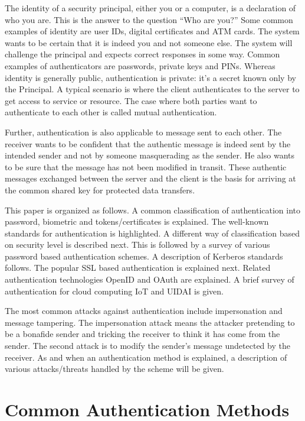 \begin{multicols}{2}
The identity of a security principal, either you or a computer, is a declaration of who you are. This is the answer to the question ``Who are you?'' Some common examples of identity are user IDs, digital certificates and ATM cards. The system wants to be certain that it is indeed you and not someone else. The system will challenge the principal and expects correct responses in some way. Common examples of authenticators are passwords, private keys and PINs. Whereas identity is generally public, authentication is private: it's a secret known only by the Principal. A typical scenario is where the client authenticates to the server to get access to service or resource. The case where both parties want to authenticate to each other is called mutual authentication. 

Further, authentication is also applicable to message sent to each other. The receiver wants to be confident that the authentic message is indeed sent by the intended sender and not by someone masquerading as the sender. He also wants to be sure that the message has not been modified in transit. These authentic messages exchanged between the server and the client is the basis for arriving at the common shared key for protected data transfers.

This paper is organized as follows. A common classification of authentication into password, biometric and tokens/certificates is explained. The well-known standards for authentication is highlighted. A different way of classification based on security level is described next. This is followed by a survey of various password based authentication schemes. A description of Kerberos standards follows. The popular SSL based authentication is explained next. Related authentication technologies OpenID and OAuth are explained. A brief survey of authentication for cloud computing IoT and UIDAI is given.

The most common attacks against authentication include impersonation and message tampering. The impersonation attack means the attacker pretending to be a bonafide sender and tricking the receiver to think it has come from the sender. The second attack is to modify the sender's message undetected by the receiver. As and when an authentication method is explained, a description of various attacks/threats handled by the scheme will be given.\\[-22pt]

\section*{Common Authentication Methods}


\end{multicols}
